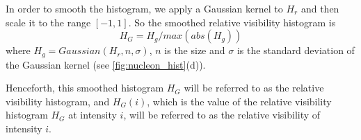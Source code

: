 \documentclass[twoside,twocolumn,10pt]{article}
\begin{document}

In order to smooth the histogram, we apply a Gaussian kernel to $ H_{r} $ and then scale it to the range $ [-1,1] $.
So the smoothed relative visibility histogram is
\[ H_{G}= H_{g}/max(abs(H_{g})) \]
where $ H_{g}=Gaussian(H_{r},n,\sigma)$, $ n $ is the size and $ \sigma $ is the standard deviation of the Gaussian kernel (see \autoref{fig:nucleon_hist}(d)).

Henceforth, this smoothed histogram $ H_{G} $ will be referred to as the relative visibility histogram, and $ H_{G}(i) $, which is the value of the relative visibility histogram $ H_{G} $ at intensity $ i $, will be referred to as the relative visibility of intensity $ i$.
\end{document}
